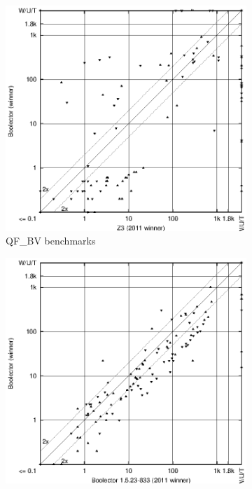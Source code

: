 \documentclass[twosize,11pt]{article}
\begin{document}
\begin{figure}[ht]
\centering
\begin{subfigure}{0.45\textwidth}
	   \includegraphics[width=1\textwidth]{QF_BV-scatter-improvement.eps}
	   \caption{QF\_BV benchmarks}
	\end{subfigure}
\begin{subfigure}{0.45\textwidth}
	   \includegraphics[width=1\textwidth]{QF_AUFBV-scatter-improvement.eps}

\end{subfigure}
\end{figure}
\end{document}
